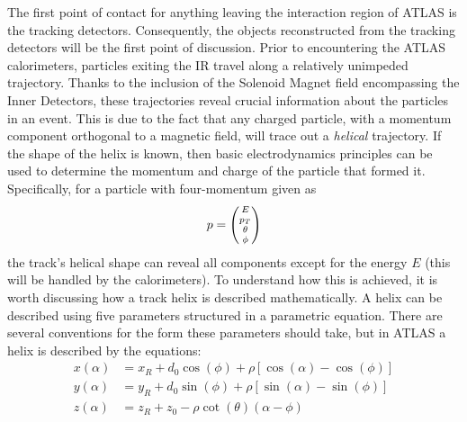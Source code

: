            The first point of contact for anything leaving the interaction region of ATLAS is the tracking detectors.
            Consequently, the objects reconstructed from the tracking detectors will be the first point of discussion.
            Prior to encountering the ATLAS calorimeters, particles exiting the IR travel along a relatively unimpeded trajectory.
            Thanks to the inclusion of the Solenoid Magnet field encompassing the Inner Detectors,
                these trajectories reveal crucial information about the particles in an event.
            This is due to the fact that any charged particle, with a momentum component orthogonal to a magnetic field,
                will trace out a \textit{helical} trajectory.
            If the shape of the helix is known, then basic electrodynamics principles can be used to determine the
                momentum and charge of the particle that formed it.
            Specifically, for a particle with four-momentum given as 
            \begin{equation}
            p = \minimatrix{E \\ p_T \\ \theta \\ \phi}
            \end{equation}
            the track's helical shape can reveal all components except for the energy $E$ (this will be handled by the calorimeters).
            To understand how this is achieved, it is worth discussing how a track helix is described mathematically.
            A helix can be described using five parameters structured in a parametric equation.
            There are several conventions for the form these parameters should take,
                but in ATLAS a helix is described by the equations\cite{thesis_giacinto}:
            \begin{equation} \begin{split}
            x(\alpha) &= x_R + d_0 \cos(\phi) + \rho \left[ \cos(\alpha) - \cos(\phi) \right] \\
            y(\alpha) &= y_R + d_0 \sin(\phi) + \rho \left[ \sin(\alpha) - \sin(\phi) \right] \\
            z(\alpha) &= z_R + z_0 - \rho \cot(\theta) (\alpha - \phi)
            \end{split} \end{equation}

